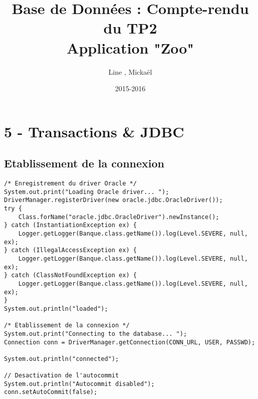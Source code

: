 \documentclass{article}
\title{Base de Données : Compte-rendu du TP2\\Application "Zoo"}
\author{Line \bsc{POUVARET}, Mickaël \bsc{TURNEL}}
\date{2015-2016}
\begin{document}
\maketitle

\section*{5 -	Transactions \& JDBC}
\subsection*{Etablissement de la connexion}
	\begin{lstlisting}
/* Enregistrement du driver Oracle */
System.out.print("Loading Oracle driver... "); 
DriverManager.registerDriver(new oracle.jdbc.OracleDriver());
try {
	Class.forName("oracle.jdbc.OracleDriver").newInstance();
} catch (InstantiationException ex) {
	Logger.getLogger(Banque.class.getName()).log(Level.SEVERE, null, ex);
} catch (IllegalAccessException ex) {
	Logger.getLogger(Banque.class.getName()).log(Level.SEVERE, null, ex);
} catch (ClassNotFoundException ex) {
	Logger.getLogger(Banque.class.getName()).log(Level.SEVERE, null, ex);
}
System.out.println("loaded");
  	    
/* Etablissement de la connexion */
System.out.print("Connecting to the database... "); 
Connection conn = DriverManager.getConnection(CONN_URL, USER, PASSWD);

System.out.println("connected");

// Desactivation de l'autocommit
System.out.println("Autocommit disabled");
conn.setAutoCommit(false);
	\end{lstlisting}
\end{document}
